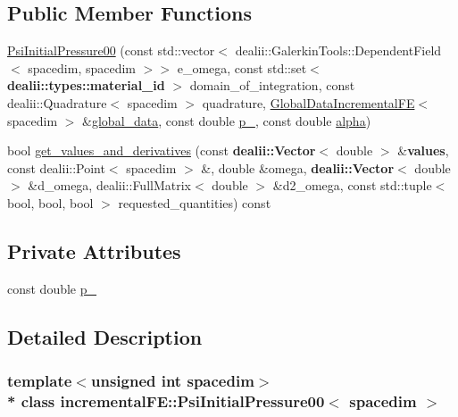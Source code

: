 \subsection*{Public Member Functions}
\begin{DoxyCompactItemize}
\item 
\hyperlink{classincremental_f_e_1_1_psi_initial_pressure00_a5776a7b2766d5997b63e992df064fc73}{Psi\+Initial\+Pressure00} (const std\+::vector$<$ dealii\+::\+Galerkin\+Tools\+::\+Dependent\+Field$<$ spacedim, spacedim $>$$>$ e\+\_\+omega, const std\+::set$<$ {\bf dealii\+::types\+::material\+\_\+id} $>$ domain\+\_\+of\+\_\+integration, const dealii\+::\+Quadrature$<$ spacedim $>$ quadrature, \hyperlink{classincremental_f_e_1_1_global_data_incremental_f_e}{Global\+Data\+Incremental\+FE}$<$ spacedim $>$ \&\hyperlink{classincremental_f_e_1_1_psi_3_01spacedim_00_01spacedim_01_4_abf0a4804877fd7cc9bd1b90e52760ba9}{global\+\_\+data}, const double \hyperlink{classincremental_f_e_1_1_psi_initial_pressure00_a8acf3825dbfea2fe0e0ebc5711b93fca}{p\+\_}, const double \hyperlink{classincremental_f_e_1_1_psi_3_01spacedim_00_01spacedim_01_4_af7b8227188dbdd6ada35b9445d96c79d}{alpha})
\item 
bool \hyperlink{classincremental_f_e_1_1_psi_initial_pressure00_aeb78a4eb41e692ff1b0f75f2695858fb}{get\+\_\+values\+\_\+and\+\_\+derivatives} (const {\bf dealii\+::\+Vector}$<$ double $>$ \&{\bf values}, const dealii\+::\+Point$<$ spacedim $>$ \&, double \&omega, {\bf dealii\+::\+Vector}$<$ double $>$ \&d\+\_\+omega, dealii\+::\+Full\+Matrix$<$ double $>$ \&d2\+\_\+omega, const std\+::tuple$<$ bool, bool, bool $>$ requested\+\_\+quantities) const 
\end{DoxyCompactItemize}
\subsection*{Private Attributes}
\begin{DoxyCompactItemize}
\item 
const double \hyperlink{classincremental_f_e_1_1_psi_initial_pressure00_a8acf3825dbfea2fe0e0ebc5711b93fca}{p\+\_}
\end{DoxyCompactItemize}


\subsection{Detailed Description}
\subsubsection*{template$<$unsigned int spacedim$>$\\*
class incremental\+F\+E\+::\+Psi\+Initial\+Pressure00$<$ spacedim $>$}


